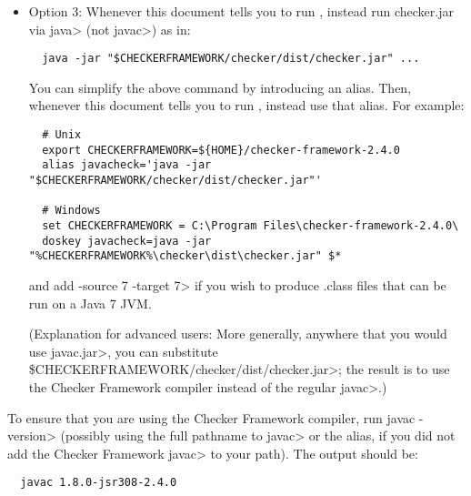 \begin{itemize}
   \item
   Option 3:
   Whenever this document tells you to run , instead
   run checker.jar via \<java> (not \<javac>) as in:

\begin{Verbatim}
  java -jar "$CHECKERFRAMEWORK/checker/dist/checker.jar" ...
\end{Verbatim}

    You can simplify the above command by introducing an alias.  Then,
    whenever this document tells you to run , instead use that
    alias.  For example:

\begin{Verbatim}
  # Unix
  export CHECKERFRAMEWORK=${HOME}/checker-framework-2.4.0
  alias javacheck='java -jar "$CHECKERFRAMEWORK/checker/dist/checker.jar"'

  # Windows
  set CHECKERFRAMEWORK = C:\Program Files\checker-framework-2.4.0\
  doskey javacheck=java -jar "%CHECKERFRAMEWORK%\checker\dist\checker.jar" $*
\end{Verbatim}

   \noindent
   and add \<-source 7 -target 7> if you wish to produce .class files that
   can be run on a Java 7 JVM.

   (Explanation for advanced users:  More generally, anywhere that you would use \<javac.jar>, you can substitute
   \<\$CHECKERFRAMEWORK/checker/dist/checker.jar>;
   the result is to use the Checker
   Framework compiler instead of the regular \<javac>.)

\end{itemize}


To ensure that you are using the Checker Framework compiler, run
\<javac -version> (possibly using the
full pathname to \<javac> or the alias, if you did not add the Checker
Framework \<javac> to your path).
The output should be:

\begin{Verbatim}
  javac 1.8.0-jsr308-2.4.0
\end{Verbatim}




